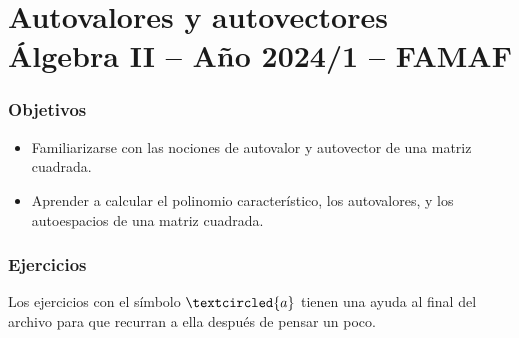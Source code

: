 \chapter{Autovalores y autovectores \\Álgebra  II -- Año 2024/1 -- FAMAF}\label{practico-5}


    
    
\subsection*{Objetivos}
    
\begin{itemize}
\item Familiarizarse con las nociones de autovalor y autovector de una matriz cuadrada.

\item Aprender a calcular el polinomio característico, los autovalores, y los autoespacios de una matriz cuadrada.
\end{itemize}
    
    
\subsection*{Ejercicios} Los ejercicios con el símbolo $\textcircled{a}$ tienen una ayuda al final del archivo para que recurran a ella después de pensar un poco.


